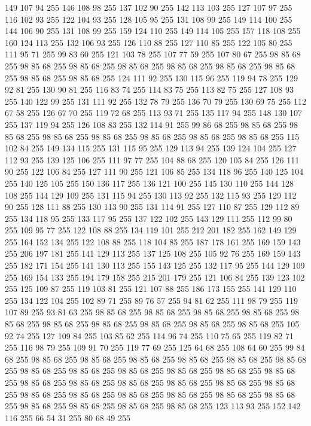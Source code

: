 149 107 94 255 146 108 98 255 137 102 90 255 142 113 103 255 127 107 97 255 116 102 93 255 122 104 93 255 128 105 95 255 131 108 99 255 149 114 100 255 144 106 90 255 131 108 99 255 159 124 110 255 149 114 105 255 157 118 108 255 160 124 113 255 132 106 93 255 126 110 88 255 127 110 85 255 122 105 80 255 111 95 71 255 99 83 60 255 121 103 78 255 107 77 59 255 107 80 67 255 98 85 68 255 98 85 68 255 98 85 68 255 98 85 68 255 98 85 68 255 98 85 68 255 98 85 68 255 98 85 68 255 98 85 68 255 124 111 92 255 130 115 96 255 119 94 78 255 129 92 81 255 130 90 81 255 116 83 74 255 114 83 75 255 113 82 75 255 127 108 93 255 140 122 99 255 131 111 92 255 132 78 79 255 136 70 79 255 130 69 75 255 112 67 58 255 126 67 70 255 119 72 68 255 113 93 71 255 135 117 94 255 148 130 107 255 137 119 94 255 126 108 83 255 132 114 91 255 99 86 68 255 98 85 68 255 98 85 68 255 98 85 68 255 98 85 68 255 98 85 68 255 98 85 68 255
98 85 68 255 115 102 84 255 149 134 115 255 131 115 95 255 129 113 94 255 139 124 104 255 127 112 93 255 139 125 106 255 111 97 77 255 104 88 68 255 120 105 84 255 126 111 90 255 122 106 84 255 127 111 90 255 121 106 85 255 134 118 96 255 140 125 104 255 140 125 105 255 150 136 117 255 136 121 100 255 145 130 110 255 144 128 108 255 144 129 109 255 131 115 94 255 130 113 92 255 132 115 93 255 129 112 90 255 128 111 88 255 130 113 90 255 131 114 91 255 127 110 87 255 129 112 89 255 134 118 95 255 133 117 95 255 137 122 102 255 143 129 111 255 112 99 80 255 109 95 77 255 122 108 88 255 134 119 101 255 212 201 182 255 162 149 129 255 164 152 134 255 122 108 88 255 118 104 85 255 187 178 161 255 169 159 143 255 206 197 181 255 141 129 113 255 137 125 108 255 105 92 76 255 169 159 143 255 182 171 154 255 141 130 113 255 155 143 125 255 132 117 95 255 144 129 109 255 169 154 133 255 194 179 158 255 215 201 179 255 121 106 84 255 139 123 102 255 125 109 87 255 119 103 81 255
121 107 88 255 186 173 155 255 141 129 110 255 134 122 104 255 102 89 71 255 89 76 57 255 94 81 62 255 111 98 79 255 119 107 89 255 93 81 63 255 98 85 68 255 98 85 68 255 98 85 68 255 98 85 68 255 98 85 68 255 98 85 68 255 98 85 68 255 98 85 68 255 98 85 68 255 98 85 68 255 105 92 74 255 127 109 84 255 103 85 62 255 114 96 74 255 110 75 65 255 119 82 71 255 116 98 79 255 109 91 70 255 119 77 69 255 125 64 68 255 108 64 60 255 99 84 68 255 98 85 68 255 98 85 68 255 98 85 68 255 98 85 68 255 98 85 68 255 98 85 68 255 98 85 68 255 98 85 68 255 98 85 68 255 98 85 68 255 98 85 68 255 98 85 68 255 98 85 68 255 98 85 68 255 98 85 68 255 98 85 68 255 98 85 68 255 98 85 68 255 98 85 68 255 98 85 68 255 98 85 68 255 98 85 68 255 98 85 68 255 98 85 68 255 98 85 68 255 98 85 68 255 98 85 68 255 98 85 68 255 123 113 93 255 152 142 116 255 66 54 31 255 80 68 49 255
